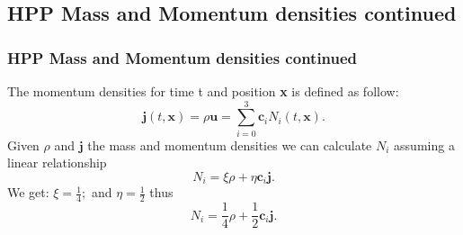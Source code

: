 \documentclass{beamer}
\begin{document}
	\subsection{HPP Mass and Momentum densities continued}
	\begin{frame}
	\frametitle{HPP Mass and Momentum densities continued}
	
    The momentum densities for time t and position \textbf{x} is defined as follow:
\[\boldsymbol{j}(t, \textbf{x}) = \rho\boldsymbol{u} = \sum_{i = 0}^{3} \textbf{c}_{i}N_{i}(t, \textbf{x}).\]
Given $\rho$ and $\boldsymbol{j}$ the mass and momentum densities we can calculate $N_{i}$ assuming
a linear relationship
\[N_{i} = \xi\rho + \eta\textbf{c}_{i}\boldsymbol{j}.\]
We get: $\xi = \frac{1}{4};$ and $\eta = \frac{1}{2}$ thus
	\[N_{i} =\frac{1}{4}\rho + \frac{1}{2}\textbf{c}_{i}\boldsymbol{j}.\]
	\end{frame}
	
\end{document}
